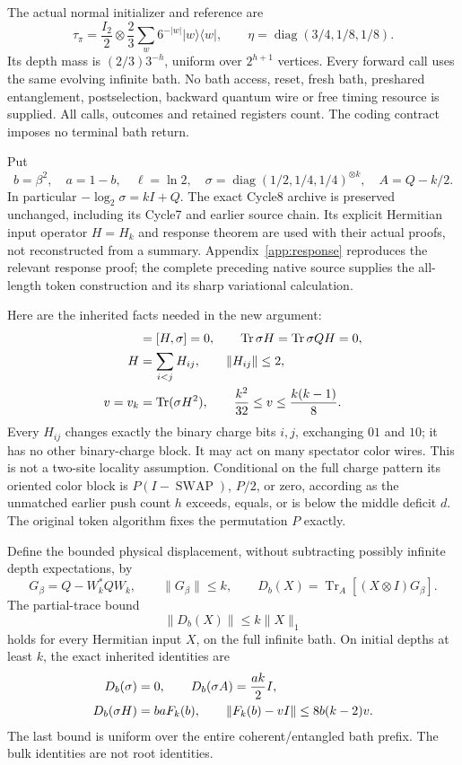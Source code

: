 \documentclass[11pt]{article}
\newcommand{\Tr}{\operatorname{Tr}}
\newcommand{\ket}[1]{\lvert #1\rangle}
\newcommand{\bra}[1]{\langle #1\rvert}
\newcommand{\norm}[1]{\lVert #1\rVert}
\newcommand{\SWAP}{\operatorname{SWAP}}
\begin{document}
The actual normal initializer and reference are
\[
 \tau_\pi=\frac{I_2}{2}\otimes\frac23\sum_w6^{-|w|}\ket w\bra w,
 \qquad \eta=\operatorname{diag}(3/4,1/8,1/8).
\]
Its depth mass is \((2/3)3^{-h}\), uniform over \(2^{h+1}\) vertices.
Every forward call uses the same evolving infinite bath. No bath access,
reset, fresh bath, preshared entanglement, postselection, backward quantum
wire or free timing resource is supplied. All calls, outcomes and retained
registers count. The coding contract imposes no terminal bath return.

Put
\[
 b=\beta^2,\quad a=1-b,\quad \ell=\ln2,\quad
 \sigma=\operatorname{diag}(1/2,1/4,1/4)^{\otimes k},\quad
 A=Q-k/2.
\]
In particular \(-\log_2\sigma=kI+Q\).
The exact Cycle8 archive is preserved unchanged, including its Cycle7 and
earlier source chain. Its explicit Hermitian input operator \(H=H_k\)
and response theorem are used with their actual proofs, not reconstructed
from a summary. Appendix~\ref{app:response} reproduces the relevant
response proof; the complete preceding native source supplies the all-length
token construction and its sharp variational calculation.

Here are the inherited facts needed in the new argument:
\begin{align}
 [H,Q]&=[H,\sigma]=0,\qquad
 \Tr\sigma H=\Tr\sigma QH=0,\notag\\
 H&=\sum_{i<j}H_{ij},\qquad \norm{H_{ij}}\le2,\label{eq:newendpoint}\\
 v=v_k&=\Tr(\sigma H^2),\qquad
 \frac{k^2}{32}\le v\le\frac{k(k-1)}8.\label{eq:newv}
\end{align}
Every \(H_{ij}\) changes exactly the binary charge bits \(i,j\), exchanging
\(01\) and \(10\); it has no other binary-charge block. It may act on many
spectator color wires. This is not a two-site locality assumption.
Conditional on the full charge pattern its oriented color block is
\(P(I-\SWAP)\), \(P/2\), or zero, according as the unmatched earlier
push count \(h\) exceeds, equals, or is below the middle deficit \(d\).
The original token algorithm fixes the permutation \(P\) exactly.

Define the bounded physical displacement, without subtracting possibly
infinite depth expectations, by
\[
 G_\beta=Q-W_k^*QW_k,\qquad \norm{G_\beta}\le k,\qquad
 D_b(X)=\Tr_A[(X\otimes I)G_\beta].
\]
The partial-trace bound
\begin{equation}\label{eq:driftnorm}
 \norm{D_b(X)}\le k\norm X_1
\end{equation}
holds for every Hermitian input \(X\), on the full infinite bath.
On initial depths at least \(k\), the exact inherited identities are
\begin{align}
 D_b(\sigma)&=0,\qquad D_b(\sigma A)=\frac{ak}{2}I,\notag\\
 D_b(\sigma H)&=baF_k(b),\qquad
 \norm{F_k(b)-vI}\le8b(k-2)v.\label{eq:newresponse}
\end{align}
The last bound is uniform over the entire coherent/entangled bath prefix.
The bulk identities are not root identities.
\end{document}
